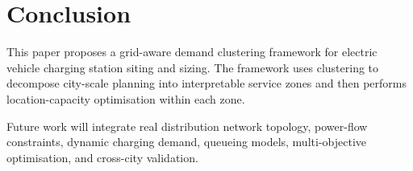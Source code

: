 \section{Conclusion}

This paper proposes a grid-aware demand clustering framework for electric vehicle charging station siting and sizing. The framework uses clustering to decompose city-scale planning into interpretable service zones and then performs location-capacity optimisation within each zone.

Future work will integrate real distribution network topology, power-flow constraints, dynamic charging demand, queueing models, multi-objective optimisation, and cross-city validation.
